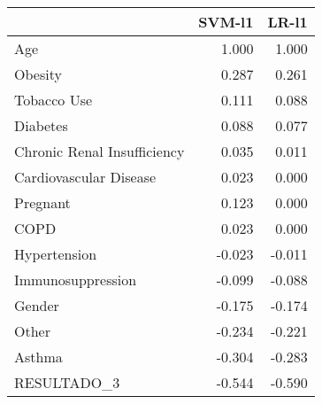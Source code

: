 \begin{tabular}{lrr}
\toprule
{} &  SVM-l1 &  LR-l1 \\
\midrule
Age                         &   1.000 &  1.000 \\
Obesity                     &   0.287 &  0.261 \\
Tobacco Use                 &   0.111 &  0.088 \\
Diabetes                    &   0.088 &  0.077 \\
Chronic Renal Insufficiency &   0.035 &  0.011 \\
Cardiovascular Disease      &   0.023 &  0.000 \\
Pregnant                    &   0.123 &  0.000 \\
COPD                        &   0.023 &  0.000 \\
Hypertension                &  -0.023 & -0.011 \\
Immunosuppression           &  -0.099 & -0.088 \\
Gender                      &  -0.175 & -0.174 \\
Other                       &  -0.234 & -0.221 \\
Asthma                      &  -0.304 & -0.283 \\
RESULTADO\_3                 &  -0.544 & -0.590 \\
\bottomrule
\end{tabular}
